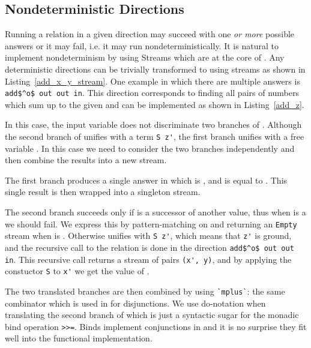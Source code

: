 


\subsection{Nondeterministic Directions}

Running a relation in a given direction may succeed with one \emph{or more} possible answers or it may fail, i.e. it may run nondeterministically.
It is natural to implement nondeterminism by using Streams which are at the core of \mk.
Any deterministic directions can be trivially transformed to using streams as shown in Listing~\ref{add_x_y_stream}.
One example in which there are multiple answers is \lstinline{add$^o$ out out in}.
This direction corresponds to finding all pairs of numbers which sum up to the given \z and can be implemented as shown in Listing~\ref{add_z}.

In this case, the input variable \z does not discriminate two branches of \conde.
Although the second branch of \conde unifies \z with a term \lstinline{S z'}, the first branch unifies \z with a free variable \y.
In this case we need to consider the two branches independently and then combine the results into a new stream.

The first \conde branch produces a single answer in which \x is \zero, and \y is equal to \z.
This single result is then wrapped into a singleton stream.

The second \conde branch succeeds only if \z is a successor of another value, thus when \z is a \zero we should fail.
We express this by pattern-matching on \z and returning an \lstinline{Empty} stream when \z is \zero.
Otherwise \z unifies with \lstinline{S z'}, which means that \lstinline{z'} is ground, and the recursive call to the relation is done in the direction \lstinline{add$^o$ out out in}.
This recursive call returns a stream of pairs \lstinline{(x', y)}, and by applying the constuctor \lstinline{S} to \lstinline{x'} we get the value of \x.

The two translated \conde branches are then combined by using \lstinline{`mplus`}: the same combinator which is used in \mk for disjunctions.
We use do-notation when translating the second branch of \conde which is just a syntactic sugar for the monadic bind operation \lstinline{>>=}.
Binds implement conjunctions in \mk and it is no surprise they fit well into the functional implementation.



